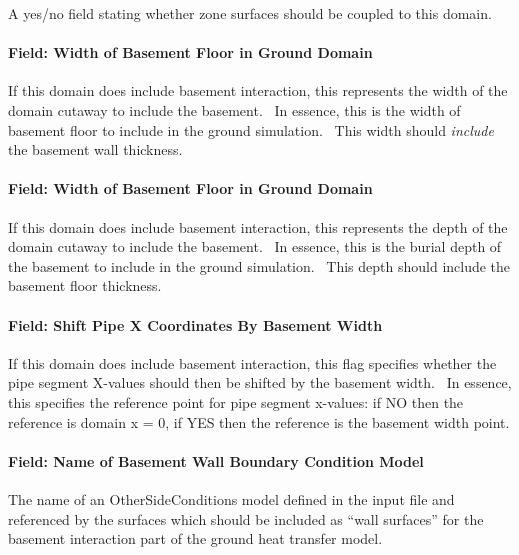 A yes/no field stating whether zone surfaces should be coupled to this domain.

\paragraph{Field: Width of Basement Floor in Ground Domain}\label{field-width-of-basement-floor-in-ground-domain}

If this domain does include basement interaction, this represents the width of the domain cutaway to include the basement.~ In essence, this is the width of basement floor to include in the ground simulation.~ This width should \emph{include} the basement wall thickness.

\paragraph{Field: Width of Basement Floor in Ground Domain}\label{field-width-of-basement-floor-in-ground-domain-1}

If this domain does include basement interaction, this represents the depth of the domain cutaway to include the basement.~ In essence, this is the burial depth of the basement to include in the ground simulation.~ This depth should include the basement floor thickness.

\paragraph{Field: Shift Pipe X Coordinates By Basement Width}\label{field-shift-pipe-x-coordinates-by-basement-width}

If this domain does include basement interaction, this flag specifies whether the pipe segment X-values should then be shifted by the basement width.~ In essence, this specifies the reference point for pipe segment x-values: if NO then the reference is domain x = 0, if YES then the reference is the basement width point.

\paragraph{Field: Name of Basement Wall Boundary Condition Model}\label{field-name-of-basement-wall-boundary-condition-model}

The name of an OtherSideConditions model defined in the input file and referenced by the surfaces which should be included as ``wall surfaces'' for the basement interaction part of the ground heat transfer model.

